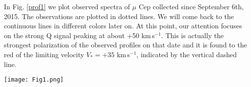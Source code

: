 \documentclass{/Users/art2/TeX/aanda/aa}
\def\kms {km\,s$^{-1}$}
\begin{document}
In  Fig. \ref{prof1} we plot observed spectra of $\mu$ Cep collected since September 6th, 2015. The observations are plotted in dotted lines. We will come back to the continuous lines in different colors later on. At this point, our attention focuses on the strong Q signal peaking at about +50 \kms. This is actually the strongest polarization of the observed profiles on that date and it is found to the red of the limiting velocity  $V_* =+35$ \kms, indicated by the vertical dashed line.
\begin{figure*}
\texttt{[image: Fig1.png]}
\caption{Observed linear polarization of $\mu$ Cep on September 6th, 2015. The observed Stokes Q is plotted at left, and Stokes U at right as dots. Continuous lines represent the best fit from the assumed model (green line) with separated contributions from the front disk brightness distribution (red) and the two plumes beyond the limb (black), visible at those wavelengths when they do not constitute the whole contribution to the final fit in green. The upper (orange) profile shows the normalized intensity profile. The vertical dashed lines give the two limiting velocities, $V_p$ and $V_*$.}
\label{prof1}
\end{figure*}
\end{document}
